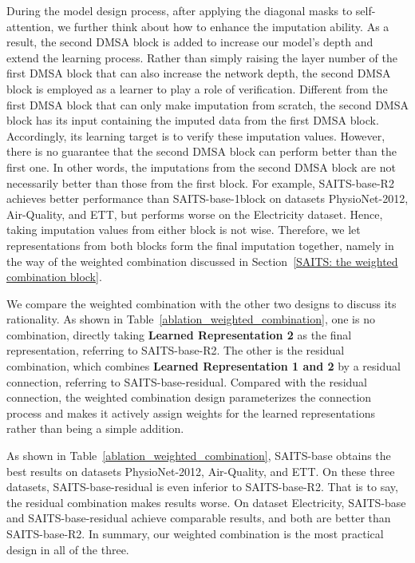 \documentclass{article}
\begin{document}
During the model design process, after applying the diagonal masks to self-attention, we further think about how to enhance the imputation ability. As a result, the second DMSA block is added to increase our model's depth and extend the learning process. Rather than simply raising the layer number of the first DMSA block that can also increase the network depth, the second DMSA block is employed as a learner to play a role of verification. Different from the first DMSA block that can only make imputation from scratch, the second DMSA block has its input containing the imputed data from the first DMSA block. Accordingly, its learning target is to verify these imputation values. However, there is no guarantee that the second DMSA block can perform better than the first one. In other words, the imputations from the second DMSA block are not necessarily better than those from the first block. For example, SAITS-base-R2 achieves better performance than SAITS-base-1block on datasets PhysioNet-2012, Air-Quality, and ETT, but performs worse on the Electricity dataset. Hence, taking imputation values from either block is not wise. Therefore, we let representations from both blocks form the final imputation together, namely in the way of the weighted combination discussed in Section~\ref{SAITS: the weighted combination block}.

We compare the weighted combination with the other two designs to discuss its rationality. As shown in Table~\ref{ablation_weighted_combination}, one is no combination, directly taking \textbf{Learned Representation 2} as the final representation, referring to SAITS-base-R2. The other is the residual combination, which combines \textbf{Learned Representation 1 and 2} by a residual connection, referring to SAITS-base-residual. Compared with the residual connection, the weighted combination design parameterizes the connection process and makes it actively assign weights for the learned representations rather than being a simple addition.

As shown in Table~\ref{ablation_weighted_combination}, SAITS-base obtains the best results on datasets PhysioNet-2012, Air-Quality, and ETT. On these three datasets, SAITS-base-residual is even inferior to SAITS-base-R2. That is to say, the residual combination makes results worse. On dataset Electricity, SAITS-base and SAITS-base-residual achieve comparable results, and both are better than SAITS-base-R2. In summary, our weighted combination is the most practical design in all of the three.
\end{document}
